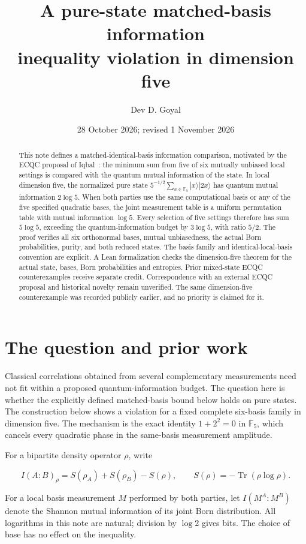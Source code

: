 \documentclass[11pt,a4paper]{article}
\title{A pure-state matched-basis information\\inequality violation in dimension five}
\author{Dev D. Goyal}
\date{28 October 2026; revised 1 November 2026}
\begin{document}
\maketitle
\begin{abstract}
This note defines a matched-identical-basis information comparison,
motivated by the ECQC proposal of Iqbal~\cite{Iqbal}: the
minimum sum from five of six mutually unbiased local settings is compared
with the quantum mutual information of the state. In local dimension five,
the normalized pure state
$5^{-1/2}\sum_{x\in\mathbb F_5}|x\rangle|2x\rangle$ has quantum mutual
information $2\log5$. When both parties use the same computational basis
or any of the five specified quadratic bases, the joint measurement table
is a uniform permutation table with mutual information $\log5$.
Every selection of five settings therefore has sum $5\log5$, exceeding
the quantum-information budget by $3\log5$, with ratio $5/2$.
The proof verifies all six orthonormal bases, mutual unbiasedness, the
actual Born probabilities, purity, and both reduced states. The basis
family and identical-local-basis convention are explicit. A Lean
formalization checks the dimension-five theorem for the actual state,
bases, Born probabilities and entropies. Prior mixed-state
ECQC counterexamples receive separate credit. Correspondence with an
external ECQC proposal and historical novelty remain unverified. The same
dimension-five counterexample was recorded publicly earlier, and no priority
is claimed for it.
\end{abstract}

\section{The question and prior work}
Classical correlations obtained from several complementary measurements
need not fit within a proposed quantum-information budget. The question
here is whether the explicitly defined matched-basis bound below holds
on pure states. The construction below shows a violation for a fixed complete
six-basis family in dimension five. The mechanism is the exact identity
$1+2^2=0$ in $\mathbb F_5$, which cancels every quadratic phase in the
same-basis measurement amplitude.

For a bipartite density operator \(\rho\), write

\[
 I(A:B)_\rho=S(\rho_A)+S(\rho_B)-S(\rho),
 \qquad S(\rho)=-\operatorname{Tr}(\rho\log\rho).
\]

For a local basis measurement \(M\) performed by both parties, let
\(I(M^A:M^B)\) denote the Shannon mutual information of its joint Born
distribution. All logarithms in this note are natural; division by
\(\log2\) gives bits. The choice of base has no effect on the
inequality.
\end{document}
